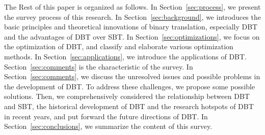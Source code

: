 The Rest of this paper is organized as follows.
In Section~\ref{sec:process}, we present the survey process of this research.
In Section~\ref{sec:background}, we introduces the basic principles and theoretical innovations of binary translation, especially DBT and the advantages of DBT over SBT.
In Section~\ref{sec:optimizations}, we focus on the optimization of DBT, and classify and elaborate various optimization methods.
In Section~\ref{sec:applications}, we introduce the applications of DBT.
Section~\ref{sec:comments} is the characteristic of the survey.
In Section~\ref{sec:comments}, we discuss the unresolved issues and possible problems in the development of DBT.
To address these challenges, we propose some possible solutions.
Then, we comprehensively considered the relationship between DBT and SBT, the historical development of DBT and the research hotspots of DBT in recent years, and put forward the future directions of DBT.
In Section~\ref{sec:conclusions}, we summarize the content of this survey.

